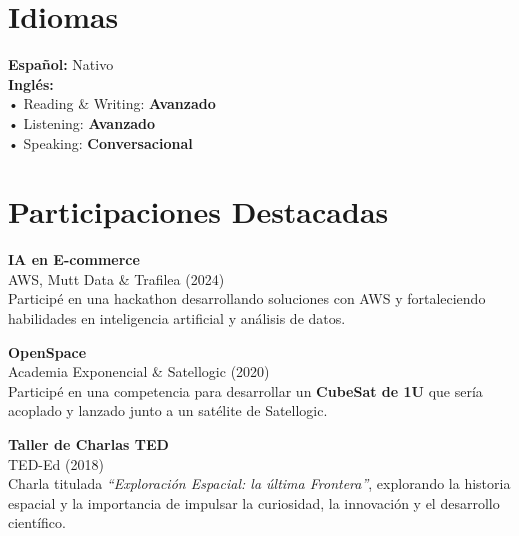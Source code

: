 \documentclass[10pt,a4paper]{article}
\newcommand{\sideitem}[3]{
  {\small\bfseries\color{darktext}#1}\\[1pt]
  {\footnotesize\color{primary}#2} {\footnotesize\color{mutedtext}(#3)}\\[1.5pt]
}
\begin{document}
\begin{minipage}[t]{6.3cm}
\section{Idiomas}
{\footnotesize\color{darktext}
\textbf{Español:} Nativo\\[2.5pt]
\textbf{Inglés:}\\
\hspace*{0.3em}• Reading \& Writing: \textbf{Avanzado}\\
\hspace*{0.3em}• Listening: \textbf{Avanzado}\\
\hspace*{0.3em}• Speaking: \textbf{Conversacional}
}

\section{Participaciones Destacadas}

\sideitem{IA en E-commerce}{AWS, Mutt Data \& Trafilea}{2024}
{\footnotesize\color{mutedtext}Participé en una hackathon desarrollando soluciones con AWS y fortaleciendo habilidades en inteligencia artificial y análisis de datos.}\vspace{5pt}

\sideitem{OpenSpace}{Academia Exponencial \& Satellogic}{2020}
{\footnotesize\color{mutedtext}Participé en una competencia para desarrollar un \textbf{CubeSat de 1U} que sería acoplado y lanzado junto a un satélite de Satellogic.}\vspace{5pt}

\sideitem{Taller de Charlas TED}{TED-Ed}{2018}
{\footnotesize\color{mutedtext}Charla titulada \textit{``Exploración Espacial: la última Frontera''}, explorando la historia espacial y la importancia de impulsar la curiosidad, la innovación y el desarrollo científico.}

\end{minipage}
\end{document}
